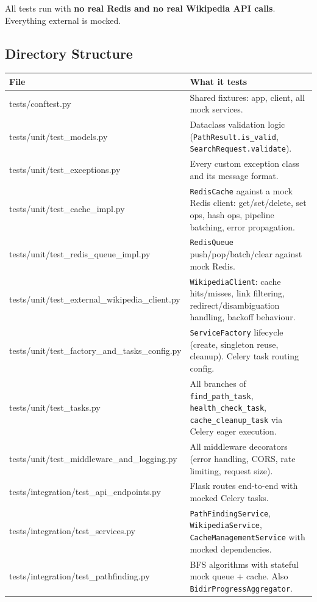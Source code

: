 \documentclass[11pt,a4paper]{article}
\begin{document}
\begin{notebox}
All tests run with \textbf{no real Redis and no real Wikipedia API calls}. Everything external is mocked.
\end{notebox}

\subsection{Directory Structure}

\begin{tabularx}{\textwidth}{@{}>{\ttfamily}l X@{}}
\toprule
\normalfont\textbf{File} & \textbf{What it tests} \\
\midrule
tests/conftest.py & Shared fixtures: app, client, all mock services. \\
tests/unit/test\_models.py & Dataclass validation logic (\texttt{PathResult.is\_valid}, \texttt{SearchRequest.validate}). \\
tests/unit/test\_exceptions.py & Every custom exception class and its message format. \\
tests/unit/test\_cache\_impl.py & \texttt{RedisCache} against a mock Redis client: get/set/delete, set ops, hash ops, pipeline batching, error propagation. \\
tests/unit/test\_redis\_queue\_impl.py & \texttt{RedisQueue} push/pop/batch/clear against mock Redis. \\
tests/unit/test\_external\_wikipedia\_client.py & \texttt{WikipediaClient}: cache hits/misses, link filtering, redirect/disambiguation handling, backoff behaviour. \\
tests/unit/test\_factory\_and\_tasks\_config.py & \texttt{ServiceFactory} lifecycle (create, singleton reuse, cleanup). Celery task routing config. \\
tests/unit/test\_tasks.py & All branches of \texttt{find\_path\_task}, \texttt{health\_check\_task}, \texttt{cache\_cleanup\_task} via Celery eager execution. \\
tests/unit/test\_middleware\_and\_logging.py & All middleware decorators (error handling, CORS, rate limiting, request size). \\
tests/integration/test\_api\_endpoints.py & Flask routes end-to-end with mocked Celery tasks. \\
tests/integration/test\_services.py & \texttt{PathFindingService}, \texttt{WikipediaService}, \texttt{CacheManagementService} with mocked dependencies. \\
tests/integration/test\_pathfinding.py & BFS algorithms with stateful mock queue + cache. Also \texttt{BidirProgressAggregator}. \\
\bottomrule
\end{tabularx}
\end{document}
